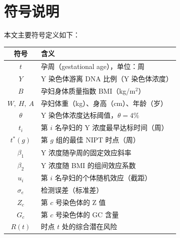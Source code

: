 \section{符号说明}

本文主要符号定义如下：

\begin{center}
\begin{tabular}{cl}
\toprule
\textbf{符号} & \textbf{含义} \\
\midrule
$t$ & 孕周（gestational age），单位：周 \\
$Y$ & Y 染色体游离 DNA 比例（Y 染色体浓度） \\
$B$ & 孕妇身体质量指数 BMI（kg/m$^2$） \\
$W,\ H,\ A$ & 孕妇体重（kg）、身高（cm）、年龄（岁） \\
$\theta$ & Y 染色体浓度达标阈值，$\theta=4\%$ \\
$t_i$ & 第 $i$ 名孕妇的 Y 浓度最早达标时间（周） \\
$t^*(g)$ & 第 $g$ 组的最佳 NIPT 时点（周） \\
$\beta_1$ & Y 浓度随孕周的固定效应斜率 \\
$\beta_2$ & Y 浓度随 BMI 的组间效应系数 \\
$u_i$ & 第 $i$ 名孕妇的个体随机效应（截距） \\
$\sigma_e$ & 检测误差（标准差） \\
$Z_c$ & 第 $c$ 号染色体的 Z 值 \\
$G_c$ & 第 $c$ 号染色体的 GC 含量 \\
$R(t)$ & 时点 $t$ 处的综合潜在风险 \\
\bottomrule
\end{tabular}
\end{center}
